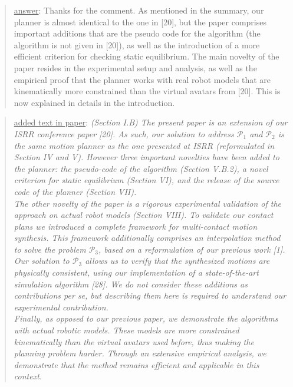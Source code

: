 \documentclass[a4paper]{article}
\newcommand{\done}[0]{}
\newcommand\as[1]{\begin{quote} \underline{answer}: {#1}\end{quote} }
\newcommand\qt[1]{\begin{quote} \underline{added text in paper}: \textit{#1}\end{quote} \leavevmode \\ }
\begin{document}
\as{Thanks for the comment. As mentioned in the summary, our planner is almost identical to the one in [20], but the paper comprises important additions that are the pseudo code for the algorithm (the algorithm is not given in [20]), as well as the introduction of a more efficient criterion
for checking static equilibrium.  The main novelty of the paper resides in the experimental setup and analysis, as well as the empirical proof that the planner works with real robot models that are kinematically more constrained than the virtual avatars from [20]. This is now explained in details in the introduction.}
\qt{(Section I.B) The present paper is an extension of our ISRR conference paper [20]. 
As such, our solution to address $\mathcal{P}_1$ and $\mathcal{P}_2$ is the same motion planner as the one presented at ISRR (reformulated in Section IV and V). 
However three important novelties have been added to the planner: the pseudo-code of the algorithm (Section V.B.2), a novel criterion for
static equilibrium (Section VI), and the release of the source code of the planner (Section VII). \\
The other novelty of the paper is a rigorous experimental validation of the approach on actual robot models (Section VIII).
To validate our contact plans we introduced a complete framework for multi-contact motion synthesis. This framework additionally comprises an interpolation method to solve the problem $\mathcal{P}_3$,  based on a reformulation of our previous work [1]. Our solution to $\mathcal{P}_3$ allows us to verify that the synthesized motions are physically consistent, using our implementation of a state-of-the-art simulation algorithm [28]. 
We do not consider these additions as contributions \textit{per se}, but describing them here is required to understand our experimental contribution. \\
Finally, as opposed to our previous paper, we demonstrate the algorithms with actual robotic models. These models are more constrained kinematically than the virtual avatars used before,
thus making the planning problem harder. Through an extensive empirical analysis, we demonstrate that the method remains efficient and applicable in this context.}
\done

\end{document}
